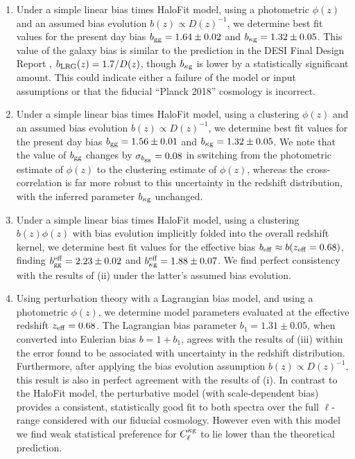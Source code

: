 \begin{enumerate}

    \item Under a simple linear bias times HaloFit model, using a photometric $\phi(z)$ and an assumed bias evolution $b(z) \propto D(z)^{-1}$, we determine best fit values for the present day bias $b_{\rm gg} = 1.64 \pm 0.02$ and $b_{\rm \kappa g} = 1.32 \pm 0.05$. This value of the galaxy bias is similar to the prediction in the DESI Final Design Report \citep{DESI16}, $b_{\rm LRG}(z) = 1.7/D(z)$, though $b_{\rm \kappa g}$ is lower by a statistically significant amount.  This could indicate either a failure of the model or input assumptions or that the fiducial ``Planck 2018'' cosmology is incorrect.
    
    \item Under a simple linear bias times HaloFit model, using a clustering $\phi(z)$ and an assumed bias evolution $b(z) \propto D(z)^{-1}$, we determine best fit values for the present day bias $b_{\rm gg} = 1.56 \pm 0.01$ and $b_{\rm \kappa g} = 1.32 \pm 0.05$. We note that the value of $b_{\rm gg}$ changes by $\sigma_{b_{\rm gg}} = 0.08$ in switching from the photometric estimate of $\phi(z)$ to the clustering estimate of $\phi(z)$, whereas the cross-correlation is far more robust to this uncertainty in the redshift distribution, with the inferred parameter $b_{\rm \kappa g}$ unchanged.
    
    \item Under a simple linear bias times HaloFit model, using a clustering $b(z)\phi(z)$ with bias evolution implicitly folded into the overall redshift kernel, we determine best fit values for the effective bias $b_{\rm eff} \approx b(z_{\rm eff} = 0.68)$, finding $b^{\rm eff}_{\rm gg} = 2.23 \pm 0.02$ and $b^{\rm eff}_{\rm \kappa g} = 1.88 \pm 0.07$. We find perfect consistency with the results of (ii) under the latter's assumed bias evolution.
    
    \item Using perturbation theory with a Lagrangian bias model, and using a photometric $\phi(z)$, we determine model parameters evaluated at the effective redshift $z_{\rm eff} = 0.68$. The Lagrangian bias parameter $b_1 = 1.31 \pm 0.05$, when converted into Eulerian bias $b = 1 + b_{1}$, agrees with the results of (iii) within the error found to be associated with uncertainty in the redshift distribution. Furthermore, after applying the bias evolution assumption $b(z) \propto D(z)^{-1}$, this result is also in perfect agreement with the results of (i).  In contrast to the HaloFit model, the perturbative model (with scale-dependent bias) provides a consistent, statistically good fit to both spectra over the full $\ell$-range considered with our fiducial cosmology.  However even with this model we find weak statistical preference for $C_\ell^{\rm \kappa g}$ to lie lower than the theoretical prediction.
    
\end{enumerate}

